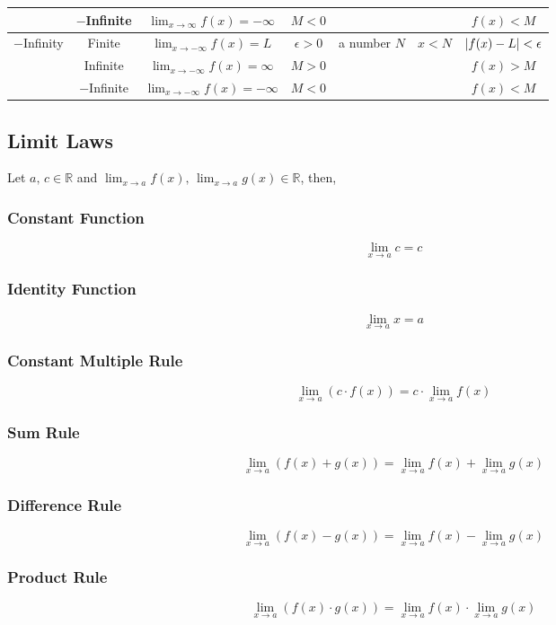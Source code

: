 \documentclass[../ma2002_notes.tex]{subfiles}
\begin{document}
\begin{tabular}{|c|c|c|c|c|c|c|}
\cline{2-4}\cline{7-7}
& \(-\)Infinite & \(\displaystyle\lim_{x\to \infty}f(x)=-\infty\) & \(M<0\) & & & \(f(x)<M\) \\
\hline
\multirow{3}{*}{\(-\)Infinity} & Finite & \(\displaystyle\lim_{x\to -\infty}f(x)=L\) & \(\epsilon>0\) & \multirow{3}{*}{a number \(N\)} & \multirow{3}{*}{\(x<N\)} & \(\lvert f(x)-L\rvert<\epsilon\) \\
\cline{2-4}\cline{7-7}
& Infinite & \(\displaystyle\lim_{x\to -\infty}f(x)=\infty\) & \(M>0\) & & & \(f(x)>M\) \\
\cline{2-4}\cline{7-7}
& \(-\)Infinite & \(\displaystyle\lim_{x\to -\infty}f(x)=-\infty\) & \(M<0\) & & & \(f(x)<M\) \\
\hline
\end{tabular}

\subsection{Limit Laws}
Let \(a,\,c\in\mathbb{R}\) and \(\displaystyle\lim_{x\to a}f(x),\,\lim_{x\to a}g(x)\in\mathbb{R}\), then,

\subsubsection{Constant Function}
\[\lim_{x\to a} c = c\]

\subsubsection{Identity Function}
\[\lim_{x\to a} x = a\]

\subsubsection{Constant Multiple Rule}
\[\lim_{x\to a} (c\cdot f(x)) = c\cdot\lim_{x\to a}f(x)\]

\subsubsection{Sum Rule}
\[\lim_{x\to a}(f(x)+g(x)) = \lim_{x\to a}f(x)+\lim_{x\to a}g(x)\]

\subsubsection{Difference Rule}
\[\lim_{x\to a}(f(x)-g(x)) = \lim_{x\to a}f(x)-\lim_{x\to a}g(x)\]

\subsubsection{Product Rule}
\[\lim_{x\to a}(f(x)\cdot g(x)) = \lim_{x\to a}f(x)\cdot \lim_{x\to a}g(x)\]
\end{document}
